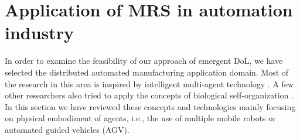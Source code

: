 \section{Application of MRS in automation industry}
\label{bg:mrs-industry}
In order to examine the feasibility of our approach of emergent DoL, we have selected the distributed automated manufacturing application domain. Most of the research in this area is inspired by intelligent multi-agent technology \cite{Shen+2001}. A few other researchers also tried to apply the concepts of biological self-organization  \cite{Ueda2006,Lazinica+2007}. In this section we have reviewed these concepts and technologies mainly focusing on physical embodiment of agents, i.e., the use of multiple mobile robots or automated guided vehicles (AGV).
%
